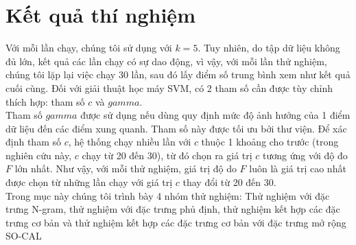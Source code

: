 \section{Kết quả thí nghiệm} \label{subsec:ket-qua-thi-nghiem}
Với mỗi lần chạy, chúng tôi sử dụng  với $k=5$. Tuy nhiên, do tập dữ liệu không đủ lớn, kết quả các lần chạy có sự dao động, vì vậy, với mỗi lần thử nghiệm, chúng tôi lặp lại việc chạy  30 lần, sau đó lấy điểm số trung bình xem như kết quả cuối cùng. Đối với giải thuật học máy SVM, có 2 tham số cần được tùy chỉnh thích hợp: tham số $c$ và $gamma$. \\

Tham số $gamma$ được sử dụng nếu dùng  quy định mức độ ảnh hưởng của 1 điểm dữ liệu đến các điểm xung quanh. Tham số này được tối ưu bởi thư viện. Để xác định tham số $c$, hệ thống chạy nhiều lần với $c$ thuộc 1 khoảng cho trước (trong nghiên cứu này, $c$ chạy từ 20 đến 30), từ đó chọn ra giá trị $c$ tương ứng với độ đo $F$ lớn nhất. Như vậy, với mỗi thử nghiệm, giá trị độ do $F$ luôn là giá trị cao nhất được chọn từ những lần chạy với giá trị $c$ thay đổi từ 20 đến 30. \\

Trong mục này chúng tôi trình bày 4 nhóm thử nghiệm: Thử nghiệm với đặc trưng N-gram, thử nghiệm với đặc trưng phủ định, thử nghiệm kết hợp các đặc trưng cơ bản và thử nghiệm kết hợp các đặc trưng cơ bản với đặc trưng mở rộng SO-CAL
